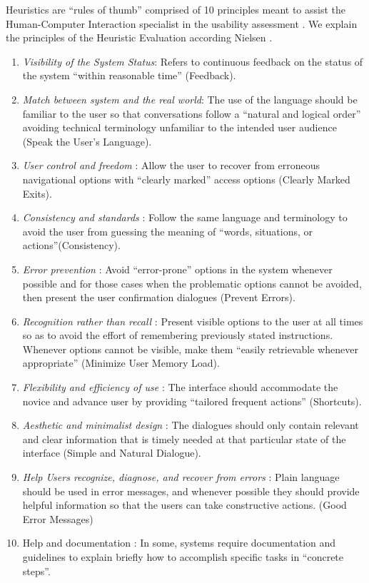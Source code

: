 \documentclass[twocolumn]{bmcart}%
\begin{document}
Heuristics are ``rules of thumb'' comprised of 10 principles meant to assist the Human-Computer Interaction specialist in the usability assessment \cite{johnson2011ehr, Nielsen10UsabilityHeuristics}. We explain the principles of the Heuristic Evaluation according Nielsen \cite{Nielsen10UsabilityHeuristics}.
\begin{enumerate}
\item \textit{Visibility of the System Status}: Refers to continuous feedback on the status of the system ``within reasonable time'' (Feedback).
\item \textit{Match between system and the real world}: The use of the language should be familiar to the user so that conversations follow a ``natural and logical order'' avoiding technical terminology unfamiliar to the intended user audience (Speak the User's Language).
\item \textit{User control and freedom} : Allow the user to recover from erroneous navigational options with ``clearly marked'' access options (Clearly Marked Exits).
\item \textit{Consistency and standards} : Follow the same language and terminology to avoid the user from guessing the meaning of ``words, situations, or actions''(Consistency).
\item \textit{Error prevention} : Avoid ``error-prone'' options in the system whenever possible and for those cases when the problematic options cannot be avoided, then present the user confirmation dialogues (Prevent Errors).
\item \textit{Recognition rather than recall} : Present visible options to the user at all times so as to avoid the effort of remembering previously stated instructions. Whenever options cannot be visible, make them ``easily retrievable whenever appropriate'' (Minimize User Memory Load).
\item \textit{Flexibility and efficiency of use} : The interface should accommodate the novice and advance user by providing ``tailored frequent actions'' (Shortcuts).
\item \textit{Aesthetic and minimalist design} : The dialogues should only contain relevant and clear information that is timely needed at that particular state of the interface (Simple and Natural Dialogue).
\item \textit{Help Users recognize, diagnose, and recover from errors} : Plain language should be used in error messages, and whenever possible they should provide helpful information so that the users can take constructive actions. (Good Error Messages)
\item Help and documentation : In some, systems require documentation and guidelines to explain briefly how to accomplish specific tasks in ``concrete steps''.
\end{enumerate}
\end{document}
